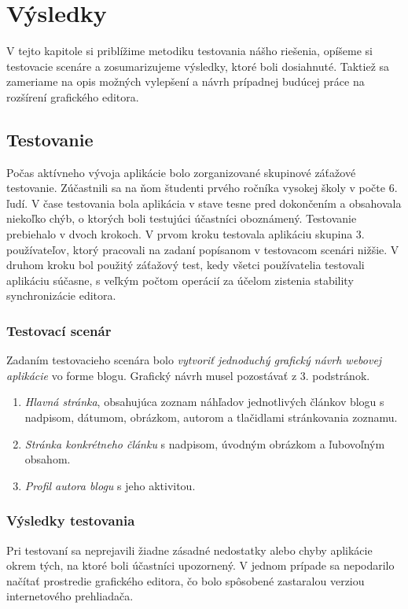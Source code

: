 \chapter{Výsledky}\label{chap:results}
V tejto kapitole si priblížime metodiku testovania nášho riešenia, opíšeme si testovacie scenáre a zosumarizujeme výsledky, ktoré boli dosiahnuté. Taktiež sa zameriame na opis možných vylepšení a návrh prípadnej budúcej práce na rozšírení grafického editora. 

\section{Testovanie}
Počas aktívneho vývoja aplikácie bolo zorganizované skupinové záťažové testovanie. Zúčastnili sa na ňom študenti prvého ročníka vysokej školy v počte 6. ľudí. V čase testovania bola aplikácia v stave tesne pred dokončením a obsahovala niekoľko chýb, o ktorých boli testujúci účastníci oboznámený. Testovanie prebiehalo v dvoch krokoch. V prvom kroku testovala aplikáciu skupina 3. používateľov, ktorý pracovali na zadaní popísanom v testovacom scenári nižšie. V druhom kroku bol použitý záťažový test, kedy všetci používatelia testovali aplikáciu súčasne, s veľkým počtom operácií za účelom zistenia stability synchronizácie editora.

\subsection{Testovací scenár}
Zadaním testovacieho scenára bolo \textit{vytvoriť jednoduchý grafický návrh webovej aplikácie} vo forme blogu. Grafický návrh musel pozostávať z 3. podstránok.
\begin{enumerate}
	\item \textit{Hlavná stránka}, obsahujúca zoznam náhľadov jednotlivých článkov blogu s nadpisom, dátumom, obrázkom, autorom a tlačidlami stránkovania zoznamu.
	\item \textit{Stránka konkrétneho článku} s nadpisom, úvodným obrázkom a ľubovoľným obsahom.
	\item \textit{Profil autora blogu} s jeho aktivitou.
\end{enumerate}

\subsection{Výsledky testovania}
Pri testovaní sa neprejavili žiadne zásadné nedostatky alebo chyby aplikácie okrem tých, na ktoré boli účastníci upozornený. V jednom prípade sa nepodarilo načítať prostredie grafického editora, čo bolo spôsobené zastaralou verziou internetového prehliadača. 

